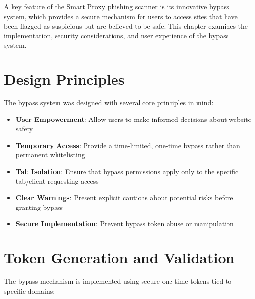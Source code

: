 A key feature of the Smart Proxy phishing scanner is its innovative bypass system, which provides a secure mechanism for users to access sites that have been flagged as suspicious but are believed to be safe. This chapter examines the implementation, security considerations, and user experience of the bypass system.

\section{Design Principles}

The bypass system was designed with several core principles in mind:

\begin{itemize}
    \item \textbf{User Empowerment}: Allow users to make informed decisions about website safety
    \item \textbf{Temporary Access}: Provide a time-limited, one-time bypass rather than permanent whitelisting
    \item \textbf{Tab Isolation}: Ensure that bypass permissions apply only to the specific tab/client requesting access
    \item \textbf{Clear Warnings}: Present explicit cautions about potential risks before granting bypass
    \item \textbf{Secure Implementation}: Prevent bypass token abuse or manipulation
\end{itemize}

\section{Token Generation and Validation}

The bypass mechanism is implemented using secure one-time tokens tied to specific domains:

